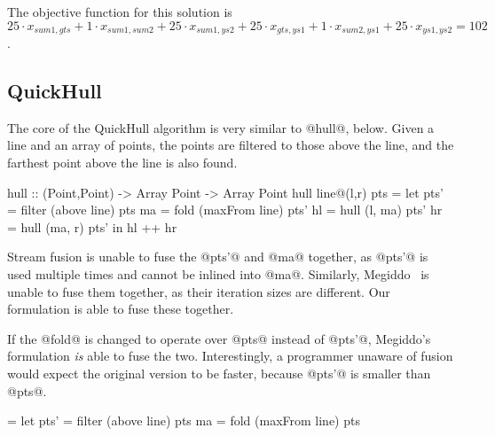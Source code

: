The objective function for this solution is
$25 \cdot x_{sum1, gts} + 1 \cdot x_{sum1,sum2} + 25 \cdot x_{sum1, ys2} + 25 \cdot x_{gts, ys1} + 1 \cdot x_{sum2, ys1} + 25 \cdot x_{ys1, ys2} = 102$.


\subsection{QuickHull}
The core of the QuickHull algorithm is very similar to @hull@, below.
Given a line and an array of points, the points are filtered to those above the line,
and the farthest point above the line is also found.

\begin{code}
hull :: (Point,Point) -> Array Point -> Array Point
hull line@(l,r) pts
 = let pts' = filter (above   line) pts
       ma   = fold   (maxFrom line) pts'
       hl   = hull   (l, ma)        pts'
       hr   = hull   (ma, r)        pts'
   in  hl  ++ hr
\end{code}

Stream fusion is unable to fuse the @pts'@ and @ma@ together, as @pts'@ is used multiple times and cannot be inlined into @ma@.
Similarly, Megiddo~\cite{megiddo1998optimal} is unable to fuse them together, as their iteration sizes are different.
Our formulation is able to fuse these together.

If the @fold@ is changed to operate over @pts@ instead of @pts'@, Megiddo's formulation \emph{is} able to fuse the two.
Interestingly, a programmer unaware of fusion would expect the original version to be faster, because @pts'@ is smaller than @pts@.

\begin{code}
 = let pts' = filter (above   line) pts
       ma   = fold   (maxFrom line) pts
\end{code}


